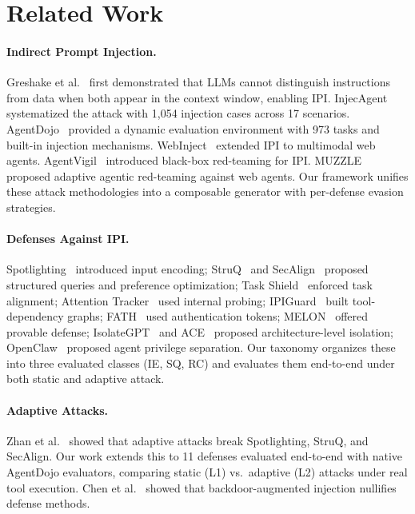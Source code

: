 \section{Related Work}
\label{sec:related}

\paragraph{Indirect Prompt Injection.}
Greshake et al.~\cite{greshake2023not} first demonstrated that LLMs cannot distinguish instructions from data when both appear in the context window, enabling IPI. InjecAgent~\cite{zhan2024injecagent} systematized the attack with 1{,}054 injection cases across 17 scenarios. AgentDojo~\cite{debenedetti2024agentdojo,debenedetti2025agentdojo} provided a dynamic evaluation environment with 973 tasks and built-in injection mechanisms. WebInject~\cite{wang2025webinject} extended IPI to multimodal web agents. AgentVigil~\cite{wang2025agentvigil} introduced black-box red-teaming for IPI. MUZZLE~\cite{syros2026muzzle} proposed adaptive agentic red-teaming against web agents. Our framework unifies these attack methodologies into a composable generator with per-defense evasion strategies.

\paragraph{Defenses Against IPI.}
Spotlighting~\cite{hines2024defending} introduced input encoding; StruQ~\cite{chen2024struq} and SecAlign~\cite{chen2024secalign} proposed structured queries and preference optimization; Task Shield~\cite{jia2025task} enforced task alignment; Attention Tracker~\cite{hung2025attention} used internal probing; IPIGuard~\cite{an2025ipiguard} built tool-dependency graphs; FATH~\cite{wang2024fath} used authentication tokens; MELON~\cite{zhu2025melon} offered provable defense; IsolateGPT~\cite{wu2025isolategpt} and ACE~\cite{li2025security} proposed architecture-level isolation; OpenClaw~\cite{cheng2026agent} proposed agent privilege separation. Our taxonomy organizes these into three evaluated classes (IE, SQ, RC) and evaluates them end-to-end under both static and adaptive attack.

\paragraph{Adaptive Attacks.}
Zhan et al.~\cite{zhan2025adaptive} showed that adaptive attacks break Spotlighting, StruQ, and SecAlign. Our work extends this to 11 defenses evaluated end-to-end with native AgentDojo evaluators, comparing static (L1) vs.\ adaptive (L2) attacks under real tool execution. Chen et al.~\cite{chen2025backdoorpowered} showed that backdoor-augmented injection nullifies defense methods.

